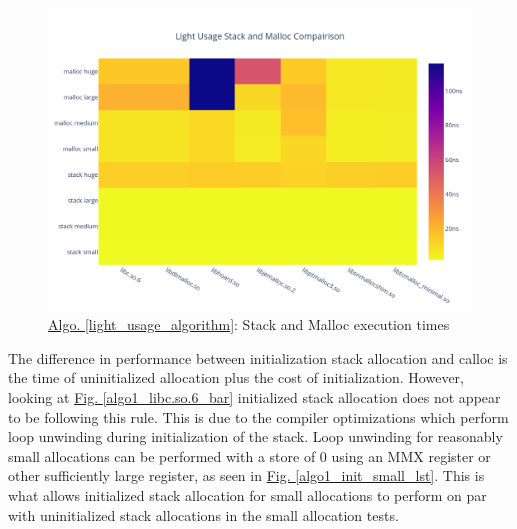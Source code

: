 \documentclass[letterpaper, 10 pt, conference]{ieeeconf}  %
\begin{document}
\begin{figure}[tbh!]
  \centering
  \includegraphics[width=\columnwidth]{graphs/light_stack_malloc_hist.png}
  \caption{ \hyperref[light_usage_algorithm]{Algo. \ref*{light_usage_algorithm}}: Stack and Malloc execution times } 
  \label{algo1_stack_malloc_hist}
\end{figure}

The difference in performance between initialization stack allocation and calloc is the time of uninitialized allocation plus the cost of initialization.
However, looking at \hyperref[algo1_libc.so.6_bar]{Fig. \ref{algo1_libc.so.6_bar}} initialized stack allocation does not appear to be following this rule.
This is due to the compiler optimizations which perform loop unwinding during initialization of the stack.
Loop unwinding for reasonably small allocations can be performed with a store of $0$ using an MMX register or other sufficiently large register, as seen in \hyperref[algo1_init_small_lst]{Fig. \ref*{algo1_init_small_lst}}.
This is what allows initialized stack allocation for small allocations to perform on par with uninitialized stack allocations in the small allocation tests.
\end{document}
